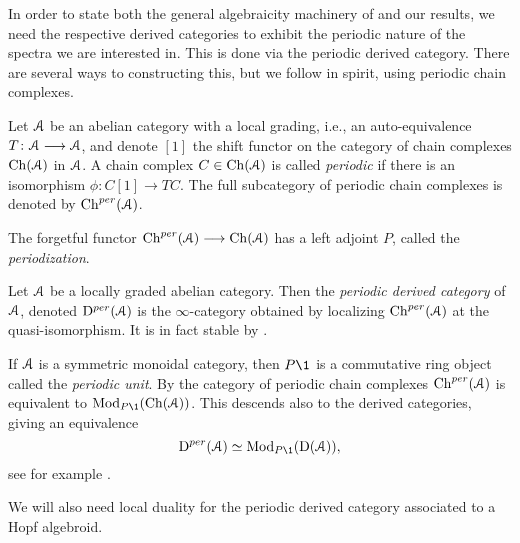 In order to state both the general algebraicity machinery of \cite{patchkoria-pstragowski_2021} and our results, we need the respective derived categories to exhibit the periodic nature of the spectra we are interested in. This is done via the periodic derived category. There are several ways to constructing this, but we follow \cite{franke_96} in spirit, using periodic chain complexes. 

\begin{definition}
    \label{ch2:def:periodic-chain-complex}
    Let $\EuScript{A}$ be an abelian category with a local grading, i.e., an auto-equivalence $T\colon \EuScript{A}\longrightarrow\EuScript{A}$, and denote $[1]$ the shift functor on the category of chain complexes $\mathrm{Ch}(\EuScript{A})$ in $\EuScript{A}$. A chain complex $C\in \mathrm{Ch}(\EuScript{A})$ is called \emph{periodic} if there is an isomorphism $\phi\colon C[1]\longrightarrow TC$. The full subcategory of periodic chain complexes is denoted by $\mathrm{Ch}^{per}(\EuScript{A})$. 
\end{definition}

\begin{definition}
    The forgetful functor $\mathrm{Ch}^{per}(\EuScript{A})\longrightarrow \mathrm{Ch}(\EuScript{A})$ has a left adjoint $P$, called the \emph{periodization}. 
\end{definition}

\begin{definition}
    \label{ch2:def:periodic-derived-category}
    Let $\EuScript{A}$ be a locally graded abelian category. Then the \emph{periodic derived category} of $\EuScript{A}$, denoted $\mathrm{D}^{per}(\EuScript{A})$ is the $\infty$-category obtained by localizing $\mathrm{Ch}^{per}(\EuScript{A})$ at the quasi-isomorphism. It is in fact stable by \cite[7.8]{patchkoria-pstragowski_2021}. 
\end{definition}

\begin{remark}
    \label{ch2:rm:periodic-derived-as-modules}
    If $\EuScript{A}$ is a symmetric monoidal category, then $P\1$ is a commutative ring object called the \emph{periodic unit}. By \cite[2.3]{barnes-roitzheim_2011} the category of periodic chain complexes $\mathrm{Ch}^{per}(\EuScript{A})$ is equivalent to $\Mod_{P\1}(\Ch(\A))$. This descends also to the derived categories, giving an equivalence 
    $$\Dper(\A)\simeq \Mod_{P\1}(\Der(\A)),$$
    see for example \cite[3.7]{pstragowski_2021}. 
\end{remark}

We will also need local duality  for the periodic derived category associated to a Hopf algebroid. 

